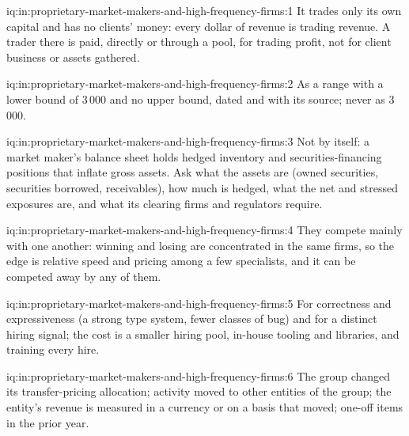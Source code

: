 \begin{solution}{iq:in:proprietary-market-makers-and-high-frequency-firms:1}
It trades only its own capital and has no clients' money: every dollar of revenue is trading revenue. A trader there
is paid, directly or through a pool, for trading profit, not for client business or assets gathered.
\end{solution}

\begin{solution}{iq:in:proprietary-market-makers-and-high-frequency-firms:2}
As a range with a lower bound of 3\,000 and no upper bound, dated and with its source; never as 3\,000.
\end{solution}

\begin{solution}{iq:in:proprietary-market-makers-and-high-frequency-firms:3}
Not by itself: a market maker's balance sheet holds hedged inventory and securities-financing positions that inflate
gross assets. Ask what the assets are (owned securities, securities borrowed, receivables), how much is hedged, what
the net and stressed exposures are, and what its clearing firms and regulators require.
\end{solution}

\begin{solution}{iq:in:proprietary-market-makers-and-high-frequency-firms:4}
They compete mainly with one another: winning and losing are concentrated in the same firms, so the edge is relative
speed and pricing among a few specialists, and it can be competed away by any of them.
\end{solution}

\begin{solution}{iq:in:proprietary-market-makers-and-high-frequency-firms:5}
For correctness and expressiveness (a strong type system, fewer classes of bug) and for a distinct hiring signal; the
cost is a smaller hiring pool, in-house tooling and libraries, and training every hire.
\end{solution}

\begin{solution}{iq:in:proprietary-market-makers-and-high-frequency-firms:6}
The group changed its transfer-pricing allocation; activity moved to other entities of the group; the entity's revenue
is measured in a currency or on a basis that moved; one-off items in the prior year.
\end{solution}
